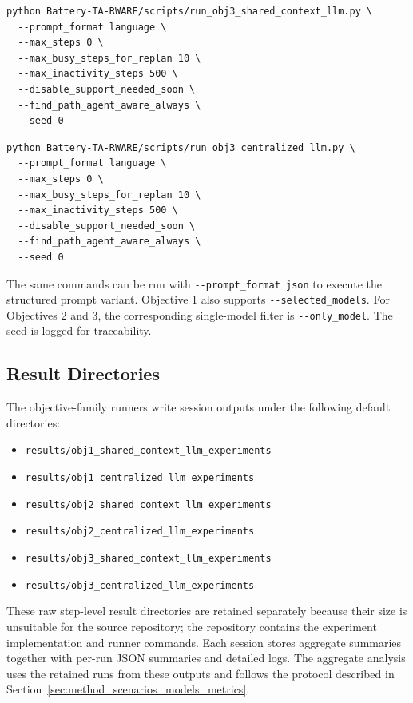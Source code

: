 \begin{lstlisting}[caption=Run Objective 3 with the shared-context planner., label=listing:run_obj3_shared]
python Battery-TA-RWARE/scripts/run_obj3_shared_context_llm.py \
  --prompt_format language \
  --max_steps 0 \
  --max_busy_steps_for_replan 10 \
  --max_inactivity_steps 500 \
  --disable_support_needed_soon \
  --find_path_agent_aware_always \
  --seed 0
\end{lstlisting}

\begin{lstlisting}[caption=Run Objective 3 with the centralized planner., label=listing:run_obj3_centralized]
python Battery-TA-RWARE/scripts/run_obj3_centralized_llm.py \
  --prompt_format language \
  --max_steps 0 \
  --max_busy_steps_for_replan 10 \
  --max_inactivity_steps 500 \
  --disable_support_needed_soon \
  --find_path_agent_aware_always \
  --seed 0
\end{lstlisting}

The same commands can be run with \nolinkurl{--prompt_format json} to execute the structured prompt variant.
Objective 1 also supports \nolinkurl{--selected_models}.
For Objectives 2 and 3, the corresponding single-model filter is \nolinkurl{--only_model}.
The seed is logged for traceability.

\subsection{Result Directories}
\label{app:result_dirs}
The objective-family runners write session outputs under the following default directories:
\begin{itemize}
    \item \nolinkurl{results/obj1_shared_context_llm_experiments}
    \item \nolinkurl{results/obj1_centralized_llm_experiments}
    \item \nolinkurl{results/obj2_shared_context_llm_experiments}
    \item \nolinkurl{results/obj2_centralized_llm_experiments}
    \item \nolinkurl{results/obj3_shared_context_llm_experiments}
    \item \nolinkurl{results/obj3_centralized_llm_experiments}
\end{itemize}
These raw step-level result directories are retained separately because their size is unsuitable for the source repository; the repository contains the experiment implementation and runner commands.
Each session stores aggregate summaries together with per-run JSON summaries and detailed logs.
The aggregate analysis uses the retained runs from these outputs and follows the protocol described in Section~\ref{sec:method_scenarios_models_metrics}.


